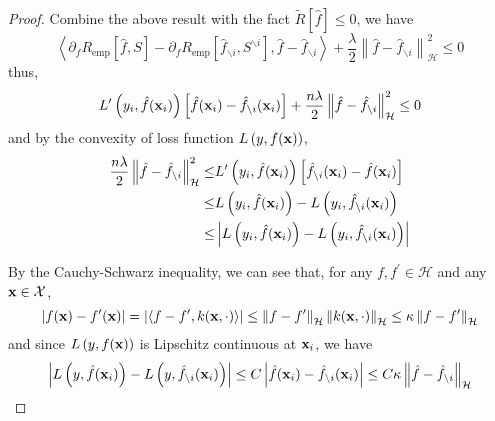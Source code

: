 \begin{proof}
	Combine the above result with the fact \(\tilde{R}[\hat{f}]\leq 0\), we have
	\begin{equation}
		\left\langle\partial_{f}R_{\text{emp}}\left[\hat{f},S\right]-\partial_{f}R_{\text{emp}}\left[\hat{f}_{\backslash i},S^{\backslash i}\right],\hat{f}-\hat{f}_{\backslash i}\right\rangle+\frac{\lambda}{2}\left\|\hat{f}-\hat{f}_{\backslash i}\right\|_{\mathcal{H}}^{2}\leq 0
	\end{equation}
	thus,
	\begin{equation}
		L^{\prime}\left(y_{i},\hat{f}(\mathbf{x}_{i})\right)\left[\hat{f}(\mathbf{x}_{i})-\hat{f}_{\backslash i}(\mathbf{x}_{i})\right]+\frac{n\lambda}{2}\left\|\hat{f}-\hat{f}_{\backslash i}\right\|_{\mathcal{H}}^{2}\leq 0
	\end{equation}
	and by the convexity of loss function \(L\left(y,f(\mathbf{x})\right)\),
	\begin{equation}
		\label{eq:rkhs-norm-by-derviative-of-tilde-R}
		\begin{aligned}
			\frac{n\lambda}{2}\left\|\hat{f}-\hat{f}_{\backslash i}\right\|_{\mathcal{H}}^{2}\leq & L^{\prime}\left(y_{i},\hat{f}(\mathbf{x}_{i})\right)\left[\hat{f}_{\backslash i}(\mathbf{x}_{i})-\hat{f}(\mathbf{x}_{i})\right] \\
			\leq                                                                                  & L\left(y_{i},\hat{f}(\mathbf{x}_{i})\right)-L\left(y_{i},\hat{f}_{\backslash i}(\mathbf{x}_{i})\right)                    \\
			\leq                                                                                  & \left|L\left(y_{i},\hat{f}(\mathbf{x}_{i})\right)-L\left(y_{i},\hat{f}_{\backslash i}(\mathbf{x}_{i})\right)\right|
		\end{aligned}
	\end{equation}

	By the Cauchy-Schwarz inequality, we can see that, for any \(f,f^{\prime}\in\mathcal{H}\) and any \(\mathbf{x}\in\mathcal{X}\),
	\begin{equation}
		\left|f(\mathbf{x})-f^{\prime}(\mathbf{x})\right|=\left|\left\langle f-f^{\prime},k(\mathbf{x},\cdot)\right\rangle\right|\leq\left\|f-f^{\prime}\right\|_{\mathcal{H}}\left\|k(\mathbf{x},\cdot)\right\|_{\mathcal{H}}\leq\kappa\left\|f-f^{\prime}\right\|_{\mathcal{H}}
	\end{equation}
	and since \(L\left(y,f(\mathbf{x})\right)\) is Lipschitz continuous at \(\mathbf{x}_{i}\),  we have
	\begin{equation}
		\label{eq:rkhs-norm-by-lipshitz-continuous}
		\left|L\left(y,\hat{f}(\mathbf{x}_{i})\right)-L\left(y,\hat{f}_{\backslash i}(\mathbf{x}_{i})\right)\right|\leq C\left|\hat{f}(\mathbf{x}_{i})-\hat{f}_{\backslash i}(\mathbf{x}_{i})\right|\leq C\kappa\left\|\hat{f}-\hat{f}_{\backslash i}\right\|_{\mathcal{H}}
	\end{equation}


\end{proof}
